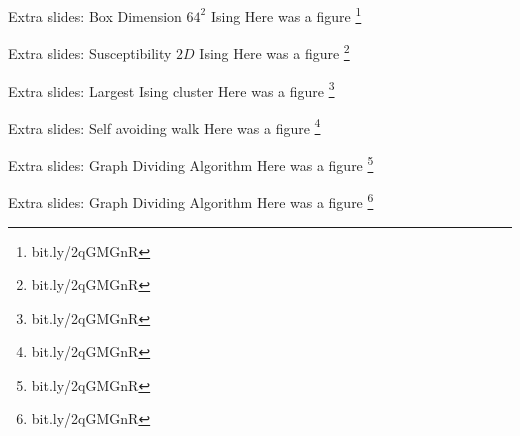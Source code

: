 \documentclass[10pt]{beamer}
\newcommand\blfootnote[1]{%
  \begingroup
  \renewcommand\thefootnote{}\footnote{#1}%
  \addtocounter{footnote}{-1}%
  \endgroup
}
\begin{document}
\appendix

\begin{frame}[fragile]{Extra slides: Box Dimension $64^2$ Ising}
            Here was a figure
    \blfootnote{bit.ly/2qGMGnR}
\end{frame}

\begin{frame}[fragile]{Extra slides: Susceptibility $2D$ Ising}
          Here was a figure
    \blfootnote{bit.ly/2qGMGnR}
\end{frame}

\begin{frame}[fragile]{Extra slides: Largest Ising cluster}
        Here was a figure
    \blfootnote{bit.ly/2qGMGnR}
\end{frame}

\begin{frame}[fragile]{Extra slides: Self avoiding walk}
        Here was a figure
    \blfootnote{bit.ly/2qGMGnR}
\end{frame}


\begin{frame}[fragile]{Extra slides: Graph Dividing Algorithm}
        Here was a figure
    \blfootnote{bit.ly/2qGMGnR}
\end{frame}

\begin{frame}[fragile]{Extra slides: Graph Dividing Algorithm}
        Here was a figure
    \blfootnote{bit.ly/2qGMGnR}
\end{frame}
\end{document}
